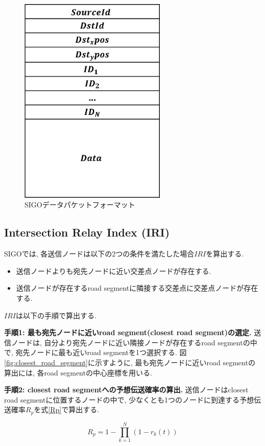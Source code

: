 \documentclass[10pt]{jreport}
\begin{document}
\begin{figure}[!ht]
	\centering
	\includegraphics[width=70mm]{figures/SIGO_packet_format.eps}
	\caption{SIGOデータパケットフォーマット}
	\label{fig:SIGO_packet}
\end{figure}


\subsection{Intersection Relay Index (IRI)}
SIGOでは, 各送信ノードは以下の2つの条件を満たした場合$IRI$を算出する.

\begin{itemize}
	\item 送信ノードよりも宛先ノードに近い交差点ノードが存在する.
	\item 送信ノードが存在するroad segmentに隣接する交差点に交差点ノードが存在する.
\end{itemize}

$IRI$は以下の手順で算出する. \par
\textbf{手順1: 最も宛先ノードに近いroad segment(closest road segment)の選定.}
送信ノードは, 自分より宛先ノードに近い隣接ノードが存在するroad segmentの中で, 宛先ノードに最も近いroad segmentを1つ選択する. 図\ref{fig:closest_road_segment}に示すように, 最も宛先ノードに近いroad segmentの算出には, 各road segmentの中心座標を用いる. 

\textbf{手順2: closest road segmentへの予想伝送確率の算出.} 送信ノードはclosest road segmentに位置するノードの中で, 少なくとも1つのノードに到達する予想伝送確率$R_p$を式\ref{Rp}で算出する.

\begin{equation}
	\label{Rp}
	R_p = 1 - \prod_{k=1}^N (1 - r_{k}(t))
\end{equation}
\end{document}
